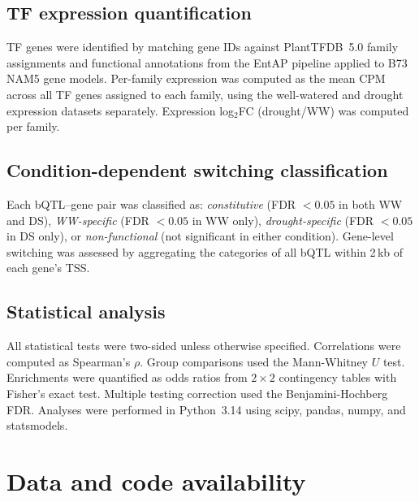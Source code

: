 \documentclass[10pt,letterpaper]{article}
\begin{document}
\subsection*{TF expression quantification}

TF genes were identified by matching gene IDs against PlantTFDB~5.0 family
assignments and functional annotations from the EntAP pipeline
\cite{hart2020} applied to B73 NAM5 gene models. Per-family expression was
computed as the mean CPM across all TF genes assigned to each family, using
the well-watered and drought expression datasets separately. Expression
log$_2$FC (drought/WW) was computed per family.

\subsection*{Condition-dependent switching classification}

Each bQTL--gene pair was classified as: \emph{constitutive} (FDR $< 0.05$ in
both WW and DS), \emph{WW-specific} (FDR $< 0.05$ in WW only),
\emph{drought-specific} (FDR $< 0.05$ in DS only), or \emph{non-functional}
(not significant in either condition). Gene-level switching was assessed by
aggregating the categories of all bQTL within 2\,kb of each gene's TSS.

\subsection*{Statistical analysis}

All statistical tests were two-sided unless otherwise specified. Correlations
were computed as Spearman's $\rho$. Group comparisons used the Mann-Whitney
$U$ test. Enrichments were quantified as odds ratios from $2 \times 2$
contingency tables with Fisher's exact test. Multiple testing correction
used the Benjamini-Hochberg FDR. Analyses were performed in Python~3.14
using scipy, pandas, numpy, and statsmodels.


\section*{Data and code availability}
\end{document}
